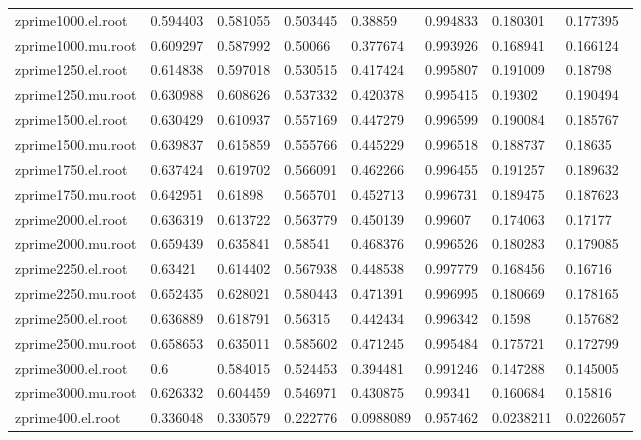 \begin{table}[]
\begin{tabular}{llllllll}
    zprime1000.el.root & 0.594403   & 0.581055   & 0.503445   & 0.38859     & 0.994833 & 0.180301    & 0.177395      \\
    zprime1000.mu.root & 0.609297   & 0.587992   & 0.50066    & 0.377674    & 0.993926 & 0.168941    & 0.166124      \\
    zprime1250.el.root & 0.614838   & 0.597018   & 0.530515   & 0.417424    & 0.995807 & 0.191009    & 0.18798       \\
    zprime1250.mu.root & 0.630988   & 0.608626   & 0.537332   & 0.420378    & 0.995415 & 0.19302     & 0.190494      \\
    zprime1500.el.root & 0.630429   & 0.610937   & 0.557169   & 0.447279    & 0.996599 & 0.190084    & 0.185767      \\
    zprime1500.mu.root & 0.639837   & 0.615859   & 0.555766   & 0.445229    & 0.996518 & 0.188737    & 0.18635       \\
    zprime1750.el.root & 0.637424   & 0.619702   & 0.566091   & 0.462266    & 0.996455 & 0.191257    & 0.189632      \\
    zprime1750.mu.root & 0.642951   & 0.61898    & 0.565701   & 0.452713    & 0.996731 & 0.189475    & 0.187623      \\
    zprime2000.el.root & 0.636319   & 0.613722   & 0.563779   & 0.450139    & 0.99607  & 0.174063    & 0.17177       \\
    zprime2000.mu.root & 0.659439   & 0.635841   & 0.58541    & 0.468376    & 0.996526 & 0.180283    & 0.179085      \\
    zprime2250.el.root & 0.63421    & 0.614402   & 0.567938   & 0.448538    & 0.997779 & 0.168456    & 0.16716       \\
    zprime2250.mu.root & 0.652435   & 0.628021   & 0.580443   & 0.471391    & 0.996995 & 0.180669    & 0.178165      \\
    zprime2500.el.root & 0.636889   & 0.618791   & 0.56315    & 0.442434    & 0.996342 & 0.1598      & 0.157682      \\
    zprime2500.mu.root & 0.658653   & 0.635011   & 0.585602   & 0.471245    & 0.995484 & 0.175721    & 0.172799      \\
    zprime3000.el.root & 0.6        & 0.584015   & 0.524453   & 0.394481    & 0.991246 & 0.147288    & 0.145005      \\
    zprime3000.mu.root & 0.626332   & 0.604459   & 0.546971   & 0.430875    & 0.99341  & 0.160684    & 0.15816       \\
    zprime400.el.root  & 0.336048   & 0.330579   & 0.222776   & 0.0988089   & 0.957462 & 0.0238211   & 0.0226057     \\

\end{tabular}
\end{table}
